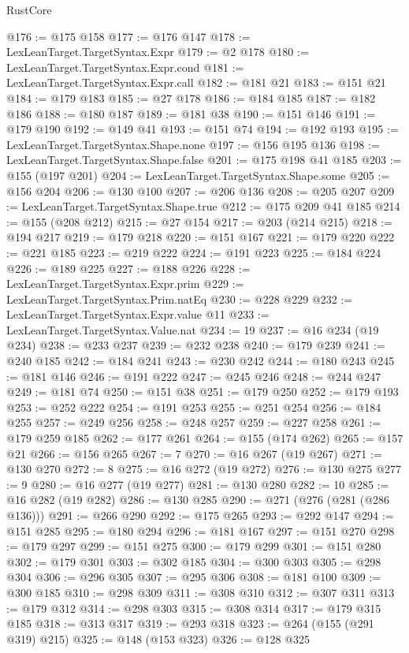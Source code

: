 \begin{lexlean}{RustCore}
\begin{coremodule}
@176 := @175 @158
@177 := @176 @147
@178 := LexLeanTarget.TargetSyntax.Expr
@179 := @2 @178
@180 := LexLeanTarget.TargetSyntax.Expr.cond
@181 := LexLeanTarget.TargetSyntax.Expr.call
@182 := @181 @21
@183 := @151 @21
@184 := @179 @183
@185 := @27 @178
@186 := @184 @185
@187 := @182 @186
@188 := @180 @187
@189 := @181 @38
@190 := @151 @146
@191 := @179 @190
@192 := @149 @41
@193 := @151 @74
@194 := @192 @193
@195 := LexLeanTarget.TargetSyntax.Shape.none
@197 := @156 @195 @136
@198 := LexLeanTarget.TargetSyntax.Shape.false
@201 := @175 @198 @41 @185
@203 := @155 (@197 @201)
@204 := LexLeanTarget.TargetSyntax.Shape.some
@205 := @156 @204
@206 := @130 @100
@207 := @206 @136
@208 := @205 @207
@209 := LexLeanTarget.TargetSyntax.Shape.true
@212 := @175 @209 @41 @185
@214 := @155 (@208 @212)
@215 := @27 @154
@217 := @203 (@214 @215)
@218 := @194 @217
@219 := @179 @218
@220 := @151 @167
@221 := @179 @220
@222 := @221 @185
@223 := @219 @222
@224 := @191 @223
@225 := @184 @224
@226 := @189 @225
@227 := @188 @226
@228 := LexLeanTarget.TargetSyntax.Expr.prim
@229 := LexLeanTarget.TargetSyntax.Prim.natEq
@230 := @228 @229
@232 := LexLeanTarget.TargetSyntax.Expr.value @11
@233 := LexLeanTarget.TargetSyntax.Value.nat
@234 := 19
@237 := @16 @234 (@19 @234)
@238 := @233 @237
@239 := @232 @238
@240 := @179 @239
@241 := @240 @185
@242 := @184 @241
@243 := @230 @242
@244 := @180 @243
@245 := @181 @146
@246 := @191 @222
@247 := @245 @246
@248 := @244 @247
@249 := @181 @74
@250 := @151 @38
@251 := @179 @250
@252 := @179 @193
@253 := @252 @222
@254 := @191 @253
@255 := @251 @254
@256 := @184 @255
@257 := @249 @256
@258 := @248 @257
@259 := @227 @258
@261 := @179 @259 @185
@262 := @177 @261
@264 := @155 (@174 @262)
@265 := @157 @21
@266 := @156 @265
@267 := 7
@270 := @16 @267 (@19 @267)
@271 := @130 @270
@272 := 8
@275 := @16 @272 (@19 @272)
@276 := @130 @275
@277 := 9
@280 := @16 @277 (@19 @277)
@281 := @130 @280
@282 := 10
@285 := @16 @282 (@19 @282)
@286 := @130 @285
@290 := @271 (@276 (@281 (@286 @136)))
@291 := @266 @290
@292 := @175 @265
@293 := @292 @147
@294 := @151 @285
@295 := @180 @294
@296 := @181 @167
@297 := @151 @270
@298 := @179 @297
@299 := @151 @275
@300 := @179 @299
@301 := @151 @280
@302 := @179 @301
@303 := @302 @185
@304 := @300 @303
@305 := @298 @304
@306 := @296 @305
@307 := @295 @306
@308 := @181 @100
@309 := @300 @185
@310 := @298 @309
@311 := @308 @310
@312 := @307 @311
@313 := @179 @312
@314 := @298 @303
@315 := @308 @314
@317 := @179 @315 @185
@318 := @313 @317
@319 := @293 @318
@323 := @264 (@155 (@291 @319) @215)
@325 := @148 (@153 @323)
@326 := @128 @325

\end{coremodule}
\end{lexlean}
